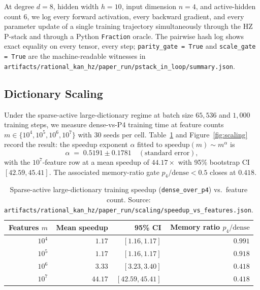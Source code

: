 \documentclass[11pt,a4paper]{article}
\begin{document}
At degree $d=8$, hidden width $h=10$, input dimension $n=4$, and
active-hidden count $6$, we log every forward activation, every
backward gradient, and every parameter update of a single training
trajectory simultaneously through the HZ P-stack and through a Python
\texttt{Fraction} oracle. The pairwise hash log shows exact equality
on every tensor, every step; \texttt{parity\_gate = True} and
\texttt{scale\_gate = True} are the machine-readable witnesses in
\texttt{artifacts/rational\_kan\_hz/paper\_run/pstack\_in\_loop/summary.json}.

\subsection{Dictionary Scaling}

Under the sparse-active large-dictionary regime at batch size
$65{,}536$ and $1{,}000$ training steps, we measure dense-vs-P4
training time at feature counts
$m \in \{10^{4}, 10^{5}, 10^{6}, 10^{7}\}$ with $30$ seeds per cell.
Table~\ref{tab:scaling} and Figure~\ref{fig:scaling} record the result:
the speedup exponent $\alpha$ fitted to $\mathrm{speedup}(m) \sim m^{\alpha}$
is
\begin{equation}
\alpha \;=\; 0.5191 \pm 0.1781 \quad (\text{standard error}),
\label{eq:alpha}
\end{equation}
with the $10^{7}$-feature row at a mean speedup of $44.17\times$ with 95\%
bootstrap CI $[42.59, 45.41]$. The associated memory-ratio gate
$p_{4}/\mathrm{dense} < 0.5$ closes at $0.418$.

\begin{table}[t]
\centering
\footnotesize
\begin{tabular}{rrrr}
\toprule
Features $m$ & Mean speedup & 95\% CI & Memory ratio $p_4/\mathrm{dense}$ \\
\midrule
$10^{4}$ & $1.17$ & $[1.16, 1.17]$ & $0.991$ \\
$10^{5}$ & $1.17$ & $[1.16, 1.17]$ & $0.918$ \\
$10^{6}$ & $3.33$ & $[3.23, 3.40]$ & $0.418$ \\
$10^{7}$ & $44.17$ & $[42.59, 45.41]$ & $0.418$ \\
\bottomrule
\end{tabular}
\caption{Sparse-active large-dictionary training speedup
(\texttt{dense\_over\_p4}) vs.\ feature count. Source: \texttt{artifacts/rational\_kan\_hz/paper\_run/scaling/speedup\_vs\_features.json}.}
\label{tab:scaling}
\end{table}
\end{document}
